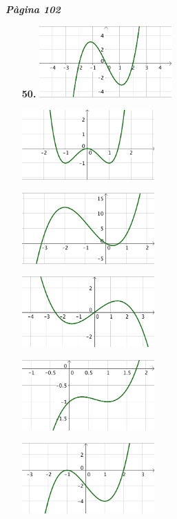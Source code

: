 \documentclass[a4paper, pdf, twoside]{book}
\begin{document}
{\textbf{\em Pàgina 102}} \hrulefill
\begin{enumerate}
\vspace{0.25cm}
\item[\fontfamily{phv}\selectfont\color{blue}\textbf{50. }] 
\mbox {}\includegraphics [width=0.4\textwidth ]{img-sol/t7-52a}\par \includegraphics [width=0.4\textwidth ]{img-sol/t7-52b}\par \includegraphics [width=0.4\textwidth ]{img-sol/t7-52c}\par \includegraphics [width=0.4\textwidth ]{img-sol/t7-52d}\par \includegraphics [width=0.4\textwidth ]{img-sol/t7-52e}\par \includegraphics [width=0.4\textwidth ]{img-sol/t7-52f}\par 
 \end{enumerate}
\end{document}
